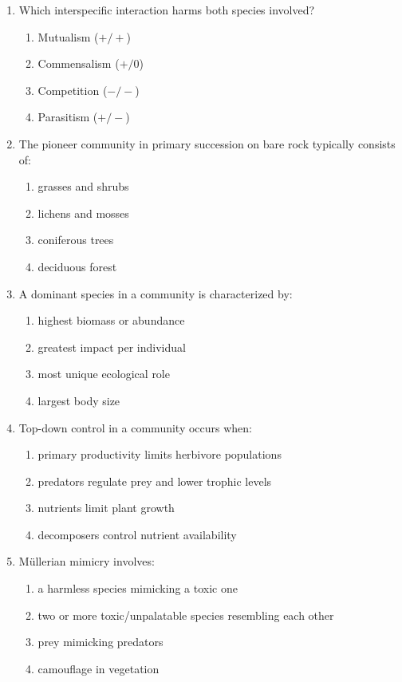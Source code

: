 \documentclass[11pt]{article}
\begin{document}
\begin{enumerate}[label=\textbf{\arabic*.}]
\clearpage

\item Which interspecific interaction harms both species involved?
\begin{enumerate}[label=\Alph*.]
  \item Mutualism ($+/+$)
  \item Commensalism ($+/0$)
  \item Competition ($-/-$)
  \item Parasitism ($+/-$)
\end{enumerate}

\item The pioneer community in primary succession on bare rock typically consists of:
\begin{enumerate}[label=\Alph*.]
  \item grasses and shrubs
  \item lichens and mosses
  \item coniferous trees
  \item deciduous forest
\end{enumerate}

\item A dominant species in a community is characterized by:
\begin{enumerate}[label=\Alph*.]
  \item highest biomass or abundance
  \item greatest impact per individual
  \item most unique ecological role
  \item largest body size
\end{enumerate}

\item Top-down control in a community occurs when:
\begin{enumerate}[label=\Alph*.]
  \item primary productivity limits herbivore populations
  \item predators regulate prey and lower trophic levels
  \item nutrients limit plant growth
  \item decomposers control nutrient availability
\end{enumerate}

\item M\"{u}llerian mimicry involves:
\begin{enumerate}[label=\Alph*.]
  \item a harmless species mimicking a toxic one
  \item two or more toxic/unpalatable species resembling each other
  \item prey mimicking predators
  \item camouflage in vegetation
\end{enumerate}


\end{enumerate}
\end{document}

